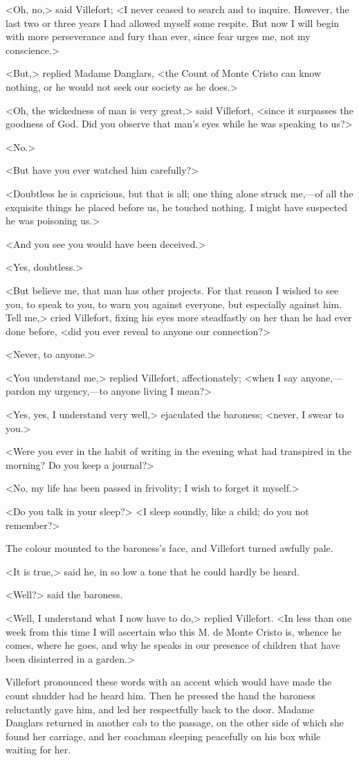  <Oh, no,> said Villefort; <I never ceased to search and to inquire. However, the last two or three years I had allowed myself some respite. But now I will begin with more perseverance and fury than ever, since fear urges me, not my conscience.> 

 <But,> replied Madame Danglars, <the Count of Monte Cristo can know nothing, or he would not seek our society as he does.> 

 <Oh, the wickedness of man is very great,> said Villefort, <since it surpasses the goodness of God. Did you observe that man's eyes while he was speaking to us?> 

 <No.> 

 <But have you ever watched him carefully?> 

 <Doubtless he is capricious, but that is all; one thing alone struck me,—of all the exquisite things he placed before us, he touched nothing. I might have suspected he was poisoning us.> 

 <And you see you would have been deceived.> 

 <Yes, doubtless.> 

 <But believe me, that man has other projects. For that reason I wished to see you, to speak to you, to warn you against everyone, but especially against him. Tell me,> cried Villefort, fixing his eyes more steadfastly on her than he had ever done before, <did you ever reveal to anyone our connection?> 

 <Never, to anyone.> 

 <You understand me,> replied Villefort, affectionately; <when I say anyone,—pardon my urgency,—to anyone living I mean?> 

 <Yes, yes, I understand very well,> ejaculated the baroness; <never, I swear to you.> 

 <Were you ever in the habit of writing in the evening what had transpired in the morning? Do you keep a journal?> 

 <No, my life has been passed in frivolity; I wish to forget it myself.> 

 <Do you talk in your sleep?>  <I sleep soundly, like a child; do you not remember?> 

 The colour mounted to the baroness's face, and Villefort turned awfully pale. 

 <It is true,> said he, in so low a tone that he could hardly be heard. 

 <Well?> said the baroness. 

 <Well, I understand what I now have to do,> replied Villefort. <In less than one week from this time I will ascertain who this M. de Monte Cristo is, whence he comes, where he goes, and why he speaks in our presence of children that have been disinterred in a garden.> 

 Villefort pronounced these words with an accent which would have made the count shudder had he heard him. Then he pressed the hand the baroness reluctantly gave him, and led her respectfully back to the door. Madame Danglars returned in another cab to the passage, on the other side of which she found her carriage, and her coachman sleeping peacefully on his box while waiting for her. 